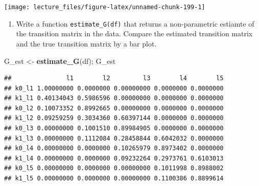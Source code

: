 \documentclass[]{book}
\newenvironment{Shaded}{\begin{snugshade}}{\end{snugshade}}
\newcommand{\KeywordTok}[1]{\textcolor[rgb]{0.13,0.29,0.53}{\textbf{#1}}}
\newcommand{\DataTypeTok}[1]{\textcolor[rgb]{0.13,0.29,0.53}{#1}}
\newcommand{\StringTok}[1]{\textcolor[rgb]{0.31,0.60,0.02}{#1}}
\newcommand{\OperatorTok}[1]{\textcolor[rgb]{0.81,0.36,0.00}{\textbf{#1}}}
\newcommand{\NormalTok}[1]{#1}
\providecommand{\tightlist}{%
  \setlength{\itemsep}{0pt}\setlength{\parskip}{0pt}}
\begin{document}
\begin{Shaded}
\end{Shaded}

\begin{center}\texttt{[image: lecture\_files/figure-latex/unnamed-chunk-199-1]} \end{center}

\begin{enumerate}
\def\labelenumi{\arabic{enumi}.}
\setcounter{enumi}{8}
\tightlist
\item
  Write a function \texttt{estimate\_G(df)} that returns a
  non-parametric estiamte of the transition matrix in the data. Compare
  the estimated transition matrix and the true transition matrix by a
  bar plot.
\end{enumerate}

\begin{Shaded}
\begin{Highlighting}[]
\NormalTok{G_est <-}\StringTok{ }\KeywordTok{estimate_G}\NormalTok{(df); G_est}
\end{Highlighting}
\end{Shaded}

\begin{verbatim}
##               l1        l2         l3        l4        l5
## k0_l1 1.00000000 0.0000000 0.00000000 0.0000000 0.0000000
## k1_l1 0.40134043 0.5986596 0.00000000 0.0000000 0.0000000
## k0_l2 0.10073352 0.8992665 0.00000000 0.0000000 0.0000000
## k1_l2 0.09259259 0.3034360 0.60397144 0.0000000 0.0000000
## k0_l3 0.00000000 0.1001510 0.89984905 0.0000000 0.0000000
## k1_l3 0.00000000 0.1112084 0.28458844 0.6042032 0.0000000
## k0_l4 0.00000000 0.0000000 0.10265979 0.8973402 0.0000000
## k1_l4 0.00000000 0.0000000 0.09232264 0.2973761 0.6103013
## k0_l5 0.00000000 0.0000000 0.00000000 0.1011998 0.8988002
## k1_l5 0.00000000 0.0000000 0.00000000 0.1100386 0.8899614
\end{verbatim}
\end{document}
